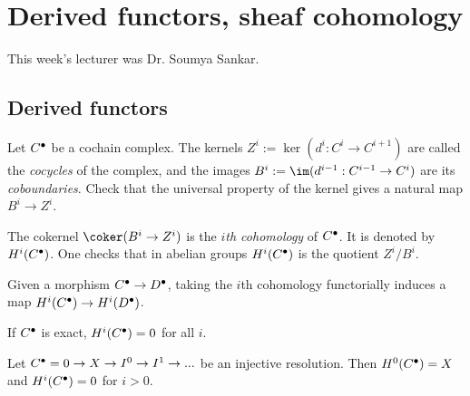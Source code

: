\chapter{Derived functors, sheaf cohomology}
\label{lecture:12}
This week's lecturer was Dr. Soumya Sankar. 

\section{Derived functors}

Let ${C}^\bullet$ be a cochain complex. 
	The kernels $Z^i:= \ker(d^i: C^i \to C^{i+1})$ are called the \emph{cocycles} of the complex, and the images $B^i := \im(d^{i-1}: C^{i-1} \to C^i)$ are its \emph{coboundaries}. 
	Check that the universal property of the kernel gives a natural map $B^i \to Z^i$.
\begin{defn}
	The cokernel $\coker(B^i \to Z^i)$ is the \emph{$i$th cohomology} of ${C}^\bullet$. It is denoted by $\cohomology^i(\cochaincomplex{C})$. One checks that in abelian groups $\cohomology^i(\cochaincomplex{C})$ is the quotient $Z^i/B^i$. 
\end{defn}

Given a morphism ${C}^\bullet \to {D}^\bullet$, taking the $i$th cohomology functorially induces a map $\cohomology^i(\cochaincomplex{C}) \to \cohomology^i(\cochaincomplex{D})$.

If ${C}^\bullet$ is exact, $\cohomology^i(\cochaincomplex{C}) = 0$ for all $i$. 

\begin{exc}
	Let ${C}^\bullet = 0 \to X \to I^0 \to I^1 \to ... $ be an injective resolution. Then $\cohomology^0(\cochaincomplex{C}) = X$ and $\cohomology^i(\cochaincomplex{C}) = 0$ for $i > 0$. 
\end{exc}

